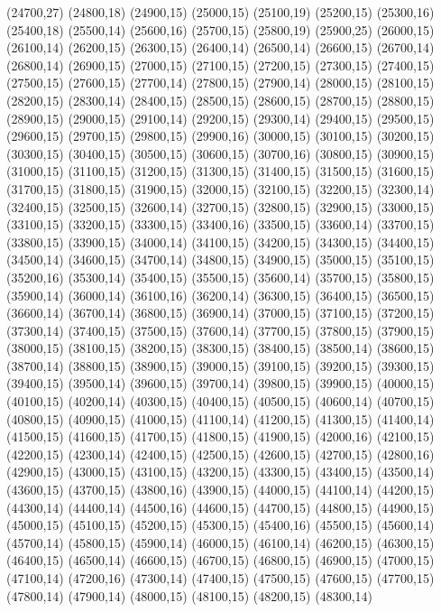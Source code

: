 (24700,27)
(24800,18)
(24900,15)
(25000,15)
(25100,19)
(25200,15)
(25300,16)
(25400,18)
(25500,14)
(25600,16)
(25700,15)
(25800,19)
(25900,25)
(26000,15)
(26100,14)
(26200,15)
(26300,15)
(26400,14)
(26500,14)
(26600,15)
(26700,14)
(26800,14)
(26900,15)
(27000,15)
(27100,15)
(27200,15)
(27300,15)
(27400,15)
(27500,15)
(27600,15)
(27700,14)
(27800,15)
(27900,14)
(28000,15)
(28100,15)
(28200,15)
(28300,14)
(28400,15)
(28500,15)
(28600,15)
(28700,15)
(28800,15)
(28900,15)
(29000,15)
(29100,14)
(29200,15)
(29300,14)
(29400,15)
(29500,15)
(29600,15)
(29700,15)
(29800,15)
(29900,16)
(30000,15)
(30100,15)
(30200,15)
(30300,15)
(30400,15)
(30500,15)
(30600,15)
(30700,16)
(30800,15)
(30900,15)
(31000,15)
(31100,15)
(31200,15)
(31300,15)
(31400,15)
(31500,15)
(31600,15)
(31700,15)
(31800,15)
(31900,15)
(32000,15)
(32100,15)
(32200,15)
(32300,14)
(32400,15)
(32500,15)
(32600,14)
(32700,15)
(32800,15)
(32900,15)
(33000,15)
(33100,15)
(33200,15)
(33300,15)
(33400,16)
(33500,15)
(33600,14)
(33700,15)
(33800,15)
(33900,15)
(34000,14)
(34100,15)
(34200,15)
(34300,15)
(34400,15)
(34500,14)
(34600,15)
(34700,14)
(34800,15)
(34900,15)
(35000,15)
(35100,15)
(35200,16)
(35300,14)
(35400,15)
(35500,15)
(35600,14)
(35700,15)
(35800,15)
(35900,14)
(36000,14)
(36100,16)
(36200,14)
(36300,15)
(36400,15)
(36500,15)
(36600,14)
(36700,14)
(36800,15)
(36900,14)
(37000,15)
(37100,15)
(37200,15)
(37300,14)
(37400,15)
(37500,15)
(37600,14)
(37700,15)
(37800,15)
(37900,15)
(38000,15)
(38100,15)
(38200,15)
(38300,15)
(38400,15)
(38500,14)
(38600,15)
(38700,14)
(38800,15)
(38900,15)
(39000,15)
(39100,15)
(39200,15)
(39300,15)
(39400,15)
(39500,14)
(39600,15)
(39700,14)
(39800,15)
(39900,15)
(40000,15)
(40100,15)
(40200,14)
(40300,15)
(40400,15)
(40500,15)
(40600,14)
(40700,15)
(40800,15)
(40900,15)
(41000,15)
(41100,14)
(41200,15)
(41300,15)
(41400,14)
(41500,15)
(41600,15)
(41700,15)
(41800,15)
(41900,15)
(42000,16)
(42100,15)
(42200,15)
(42300,14)
(42400,15)
(42500,15)
(42600,15)
(42700,15)
(42800,16)
(42900,15)
(43000,15)
(43100,15)
(43200,15)
(43300,15)
(43400,15)
(43500,14)
(43600,15)
(43700,15)
(43800,16)
(43900,15)
(44000,15)
(44100,14)
(44200,15)
(44300,14)
(44400,14)
(44500,16)
(44600,15)
(44700,15)
(44800,15)
(44900,15)
(45000,15)
(45100,15)
(45200,15)
(45300,15)
(45400,16)
(45500,15)
(45600,14)
(45700,14)
(45800,15)
(45900,14)
(46000,15)
(46100,14)
(46200,15)
(46300,15)
(46400,15)
(46500,14)
(46600,15)
(46700,15)
(46800,15)
(46900,15)
(47000,15)
(47100,14)
(47200,16)
(47300,14)
(47400,15)
(47500,15)
(47600,15)
(47700,15)
(47800,14)
(47900,14)
(48000,15)
(48100,15)
(48200,15)
(48300,14)
